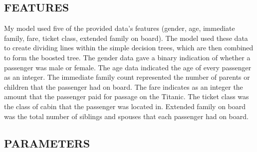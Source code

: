 \documentclass[12pt]{article}
\begin{document}
    \subsection{FEATURES}
      My model used five of the provided data's features (gender, age, immediate family, fare, ticket class, extended family on board). The model used these data to create dividing lines within the simple decision trees, which are then combined to form the boosted tree. The gender data gave a binary indication of whether a passenger was male or female. The age data indicated the age of every passenger as an integer. The immediate family count represented the number of parents or children that the passenger had on board. The fare indicates as an integer the amount that the passenger paid for passage on the Titanic. The ticket class was the class of cabin that the passenger was located in. Extended family on board was the total number of siblings and spouses that each passenger had on board.

    \subsection{PARAMETERS}

    {}
    
  
\end{document}
